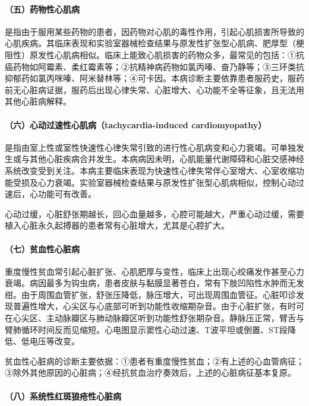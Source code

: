 \paragraph{（五）药物性心肌病}

是指由于服用某些药物的患者，因药物对心肌的毒性作用，引起心肌损害所导致的心肌疾病。其临床表现和实验室器械检查结果与原发性扩张型心肌病、肥厚型（梗阻性）原发性心肌病相似。临床上能致心肌损害的药物众多，最常见的包括：①抗癌药物如阿霉素、柔红霉素等；②抗精神病药物如氯丙嗪、奋乃静等；③三环类抗抑郁药如氯丙咪嗪、阿米替林等；④可卡因。本病诊断主要依靠患者服药史，服药前无心脏病证据，服药后出现心律失常、心脏增大、心功能不全等征象，且无法用其他心脏病解释。

\paragraph{（六）心动过速性心肌病（tachycardia-induced cardiomyopathy）}

是指由室上性或室性快速性心律失常引致的进行性心肌病变和心力衰竭。可单独发生或与其他心脏疾病合并发生。本病病因未明，心肌能量代谢障碍和心脏交感神经系统改变受到关注。本病主要临床表现为快速性心律失常伴心室增大、心室收缩功能受损及心力衰竭。实验室器械检查结果与原发性扩张型心肌病相似，控制心动过速后，心功能可有改善。

心动过缓，心脏舒张期越长，回心血量越多，心腔可能越大，严重心动过缓，需要植入心脏永久起搏器的患者常有心脏增大，尤其是心腔扩大。

\paragraph{（七）贫血性心脏病}

重度慢性贫血常引起心脏扩张、心肌肥厚与变性，临床上出现心绞痛发作甚至心力衰竭。病因最多为钩虫病，患者皮肤与黏膜显著苍白，常有下肢凹陷性水肿而无发绀。由于周围血管扩张，舒张压降低，脉压增大，可出现周围血管征。心脏叩诊发现普遍性增大，心尖区与心底部可听到功能性收缩期杂音。由于心脏扩张，有时可在心尖区、主动脉瓣区与肺动脉瓣区听到功能性舒张期杂音。静脉压正常，臂舌与臂肺循环时间反而见缩短。心电图显示窦性心动过速、T波平坦或倒置、ST段降低、低电压等改变。

贫血性心脏病的诊断主要依据：①患者有重度慢性贫血；②有上述的心血管病征；③除外其他原因的心脏病；④经抗贫血治疗奏效后，上述的心脏病征基本复原。

\paragraph{（八）系统性红斑狼疮性心脏病}

